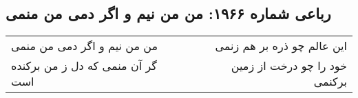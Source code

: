 \begin{center}
\section*{رباعی شماره ۱۹۶۶: من من نیم و اگر دمی من منمی}
\label{sec:1966}
\begin{longtable}{l p{0.5cm} r}
من من نیم و اگر دمی من منمی
&&
این عالم چو ذره بر هم زنمی
\\
گر آن منمی که دل ز من برکنده است
&&
خود را چو درخت از زمین برکنمی
\\
\end{longtable}
\end{center}
